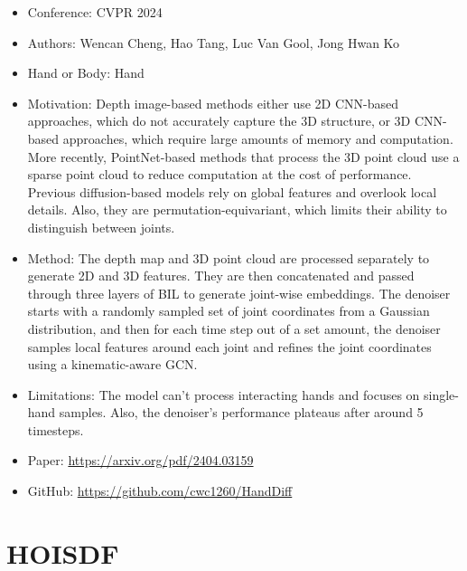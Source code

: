 \documentclass{article}
\begin{document}
\begin{itemize}
    \item Conference: CVPR 2024
    \item Authors: Wencan Cheng, Hao Tang, Luc Van Gool, Jong Hwan Ko
    \item Hand or Body: Hand
    \item Motivation: Depth image-based methods either use 2D CNN-based approaches, which do not accurately capture the 3D structure, or 3D CNN-based approaches, which require large amounts of memory and computation. More recently, PointNet-based methods that process the 3D point cloud use a sparse point cloud to reduce computation at the cost of performance. Previous diffusion-based models rely on global features and overlook local details. Also, they are permutation-equivariant, which limits their ability to distinguish between joints.
    \item Method: The depth map and 3D point cloud are processed separately to generate 2D and 3D features. They are then concatenated and passed through three layers of BIL to generate joint-wise embeddings. The denoiser starts with a randomly sampled set of joint coordinates from a Gaussian distribution, and then for each time step out of a set amount, the denoiser samples local features around each joint and refines the joint coordinates using a kinematic-aware GCN.
    \item Limitations: The model can't process interacting hands and focuses on single-hand samples. Also, the denoiser's performance plateaus after around 5 timesteps.
    \item Paper: \url{https://arxiv.org/pdf/2404.03159}
    \item GitHub: \url{https://github.com/cwc1260/HandDiff}
\end{itemize}

\section*{HOISDF}
\end{document}
